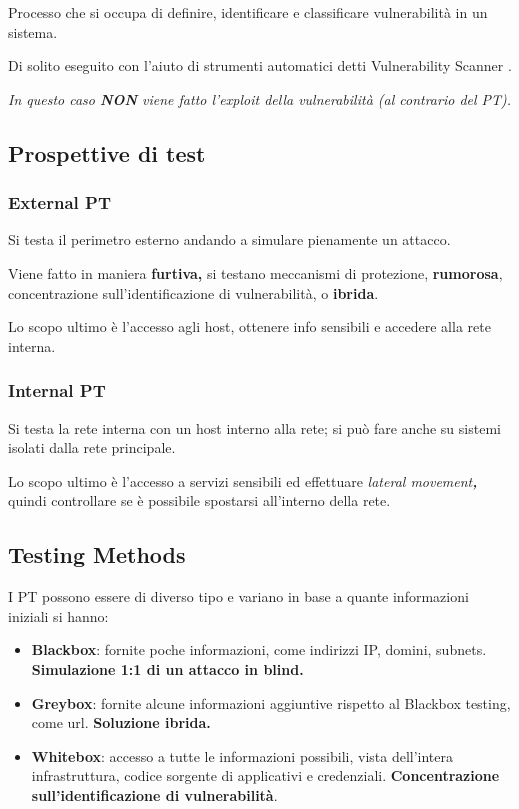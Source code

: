 Processo che si occupa di definire, identificare e classificare
vulnerabilità in un sistema.

Di solito eseguito con l'aiuto di strumenti automatici detti
Vulnerability Scanner .

\emph{In questo caso \textbf{NON} viene fatto l'exploit della
vulnerabilità (al contrario del PT).}

\subsection{Prospettive di test}\label{prospettive-di-test}

\subsubsection{External PT}\label{external-pt}

Si testa il perimetro esterno andando a simulare pienamente un attacco.

Viene fatto in maniera \textbf{furtiva,} si testano meccanismi di
protezione, \textbf{rumorosa}, concentrazione sull'identificazione di
vulnerabilità, o \textbf{ibrida}.

Lo scopo ultimo è l'accesso agli host, ottenere info sensibili e
accedere alla rete interna.

\subsubsection{Internal PT}\label{internal-pt}

Si testa la rete interna con un host interno alla rete; si può fare
anche su sistemi isolati dalla rete principale.

Lo scopo ultimo è l'accesso a servizi sensibili ed effettuare
\emph{lateral movement\textbf{, }}quindi controllare se è possibile
spostarsi all'interno della rete.

\subsection{Testing Methods}\label{testing-methods}

I PT possono essere di diverso tipo e variano in base a quante
informazioni iniziali si hanno:

\begin{itemize}
\item
  \textbf{Blackbox}: fornite poche informazioni, come indirizzi IP,
  domini, subnets. \textbf{Simulazione 1:1 di un attacco in blind.}
\item
  \textbf{Greybox}: fornite alcune informazioni aggiuntive rispetto al
  Blackbox testing, come url. \textbf{Soluzione ibrida.}
\item
  \textbf{Whitebox}: accesso a tutte le informazioni possibili, vista
  dell'intera infrastruttura, codice sorgente di applicativi e
  credenziali. \textbf{Concentrazione sull'identificazione di
  vulnerabilità}.
\end{itemize}

